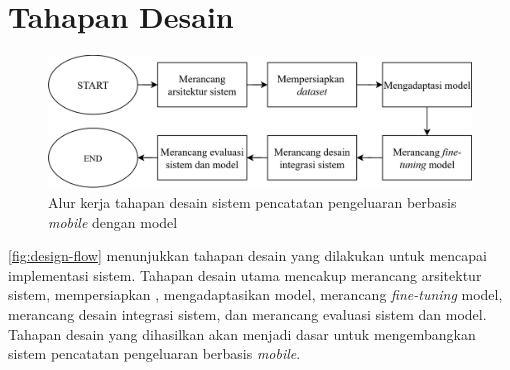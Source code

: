 \section{Tahapan Desain}
\label{sec:tahapan-desain}

\begin{figure}[htbp]
    \centering
    \includegraphics[width=1\textwidth]{images/design-flow.png}
    \caption{Alur kerja tahapan desain sistem pencatatan pengeluaran berbasis \emph{mobile} dengan model \donut}
    \label{fig:design-flow}
\end{figure}

\autoref{fig:design-flow} menunjukkan tahapan desain yang dilakukan untuk mencapai implementasi sistem. Tahapan desain utama mencakup merancang arsitektur sistem, mempersiapkan \dataset, mengadaptasikan model, merancang \emph{fine-tuning} model, merancang desain integrasi sistem, dan merancang evaluasi sistem dan model. Tahapan desain yang dihasilkan akan menjadi dasar untuk mengembangkan sistem pencatatan pengeluaran berbasis \emph{mobile}.






